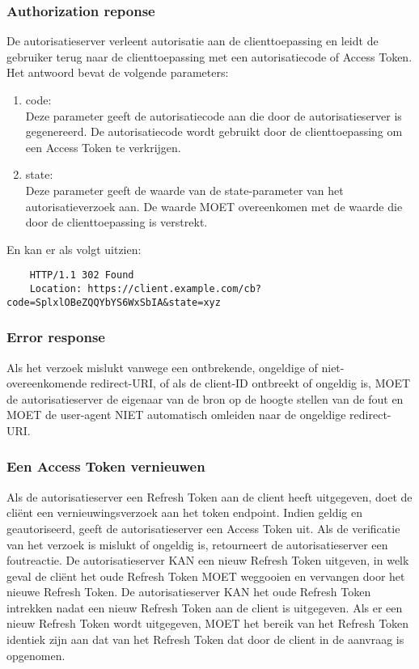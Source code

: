 \subsubsection{Authorization reponse}%
\label{subsubsec:authorization-reponse}
De autorisatieserver verleent autorisatie aan de clienttoepassing en leidt de gebruiker terug naar de clienttoepassing met een autorisatiecode of Access Token. Het antwoord bevat de volgende parameters:
\begin{enumerate}[label=\textbf{-}]
    \item code: \\
    Deze parameter geeft de autorisatiecode aan die door de autorisatieserver is gegenereerd. De autorisatiecode wordt gebruikt door de clienttoepassing om een Access Token te verkrijgen.
  
    \item state: \\
    Deze parameter geeft de waarde van de state-parameter van het autorisatieverzoek aan. De waarde MOET overeenkomen met de waarde die door de clienttoepassing is verstrekt.
  \end{enumerate}
  En kan er als volgt uitzien:
  \begin{verbatim}
    HTTP/1.1 302 Found
    Location: https://client.example.com/cb?code=SplxlOBeZQQYbYS6WxSbIA&state=xyz
  \end{verbatim}

\subsubsection{Error response}%
\label{subsubsec:error-response}
Als het verzoek mislukt vanwege een ontbrekende, ongeldige of niet-overeenkomende redirect-URI, of als de client-ID ontbreekt of ongeldig is, MOET de autorisatieserver de eigenaar van de bron op de hoogte stellen van de fout en MOET de user-agent NIET automatisch omleiden naar de ongeldige redirect-URI.

\subsubsection{Een Access Token vernieuwen}%
\label{subsubsec:een-access-token-vernieuwen}
Als de autorisatieserver een Refresh Token aan de client heeft uitgegeven, doet de cliënt een vernieuwingsverzoek aan het token endpoint.
Indien geldig en geautoriseerd, geeft de autorisatieserver een Access Token uit. Als de verificatie van het verzoek is mislukt of ongeldig is, retourneert de autorisatieserver een foutreactie.
De autorisatieserver KAN een nieuw Refresh Token uitgeven, in welk geval de cliënt het oude Refresh Token MOET weggooien en vervangen door het nieuwe Refresh Token. De autorisatieserver KAN het oude Refresh Token intrekken nadat een nieuw Refresh Token aan de client is uitgegeven. Als er een nieuw Refresh Token wordt uitgegeven, MOET het bereik van het Refresh Token identiek zijn aan dat van het Refresh Token dat door de client in de aanvraag is opgenomen.

